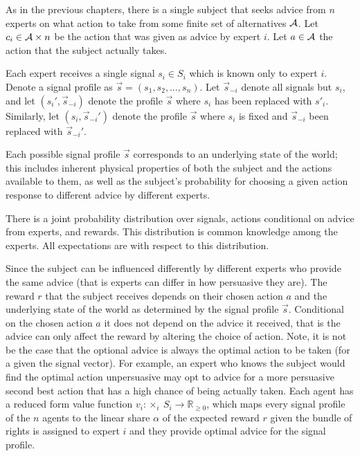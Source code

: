 As in the previous chapters, there is a single subject that seeks advice from $n$ experts on what action to take from some finite set of alternatives ${\mathcal A}$. Let $c_i \in{\mathcal A} \times n $ be the action that was given as advice by expert $i$. Let $a\in{\mathcal A}$ the action that the subject actually takes.  

Each expert receives a single signal $s_i\in S_i$ which is known only to expert $i$.
Denote a signal profile as $\vec{s}=(s_1,s_2,\ldots,s_n)$.
Let $\vec{s}_{-i}$ denote all signals but $s_i$, and let $(s_i',\vec{s}_{-i})$ denote the profile $\vec{s}$ where $s_i$ has been replaced with $s'_i$.
Similarly, let  $(s_i,\vec{s}_{-i}')$ denote the profile $\vec{s}$ where $s_i$ is fixed and $\vec{s}_{-i}$ been replaced with $\vec{s}_{-i}'$.


Each possible signal profile $\vec{s}$ corresponds to an underlying state of the world; this includes inherent physical properties of both the subject and the actions available to them, as well as the subject's probability for choosing a given action response to different advice by different experts.

There is a joint probability distribution over signals, actions conditional on advice from experts, and rewards. This distribution is common knowledge among the experts. All expectations are with respect to this distribution. 



Since the subject can be influenced differently by different experts who provide the same advice (that is experts can differ in how persuasive they are).
The reward $r$ that the subject receives depends on their chosen action $a$ and the underlying state of the world as determined by the signal profile $\vec{s}$. Conditional on the chosen action $a$ it does not depend on the advice it received, that is the advice can only affect the reward by altering the choice of action.
Note, it is not be the case that the optional advice is always the optimal action to be taken (for a given the signal vector). For example, an expert who knows the subject would find the optimal action unpersuasive may opt to advice for a more persuasive second best action that has a high chance of being actually taken.
Each agent has a reduced form  value function  $v_i: \times_i \ S_i \rightarrow \mathbb{R}_{\geq 0}$, which maps every signal profile of the $n$ agents to the  linear share $\alpha$ of the expected reward $r$ given the bundle of rights is assigned to expert $i$ and they provide optimal advice for the signal profile. 

